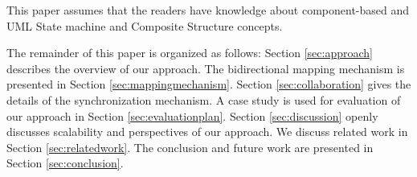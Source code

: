 This paper assumes that the readers have knowledge about component-based and UML State machine and Composite Structure concepts.

The remainder of this paper is organized as follows: Section \ref{sec:approach} describes the overview of our approach. 
The bidirectional mapping mechanism is presented in Section \ref{sec:mappingmechanism}.
Section \ref{sec:collaboration} gives the details of the synchronization mechanism.
A case study is used for evaluation of our approach in Section \ref{sec:evaluationplan}.
Section \ref{sec:discussion} openly discusses scalability and perspectives of our approach.
We discuss related work in Section \ref{sec:relatedwork}. 
The conclusion and future work are presented in Section \ref{sec:conclusion}.


